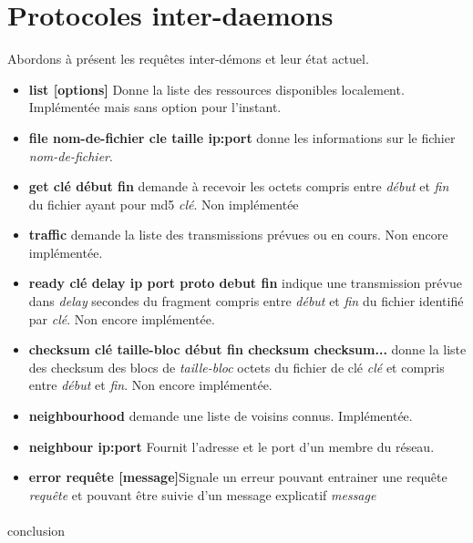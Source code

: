 	\section{Protocoles inter-daemons}
		Abordons à présent les requêtes inter-démons et leur état actuel.

\begin{itemize}
\item{\textbf{list [options]}} Donne la liste des ressources disponibles localement. Implémentée mais sans option pour l'instant.
\item{\textbf{file nom-de-fichier cle taille ip:port}} donne les informations sur le fichier \textit{nom-de-fichier}.
\item{\textbf{get clé début fin}} demande à recevoir les octets compris entre \textit{début} et \textit{fin} du fichier ayant pour md5 \textit{clé}. Non implémentée
\item{\textbf{traffic}} demande la liste des transmissions prévues ou en cours. Non encore implémentée.
\item{\textbf{ready clé delay ip port proto debut fin}} indique une transmission prévue dans \textit{delay} secondes du fragment compris entre \textit{début} et \textit{fin} du fichier identifié par \textit{clé}. Non encore implémentée.
\item{\textbf{checksum clé taille-bloc début fin checksum checksum...}} donne la liste des checksum des blocs de \textit{taille-bloc} octets du fichier de clé \textit{clé} et compris entre \textit{début} et \textit{fin}. Non encore implémentée.
\item{\textbf{neighbourhood}} demande une liste de voisins connus. Implémentée.
\item{\textbf{neighbour ip:port}} Fournit l'adresse et le port d'un membre du réseau.
\item{\textbf{error requête [message]}}Signale un erreur pouvant entrainer une requête \textit{requête} et pouvant être suivie d'un message explicatif \textit{message}
\end{itemize}

	\paragraph*{}conclusion
